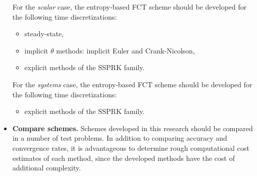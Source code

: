 \begin{itemize}
    For the \emph{scalar} case, the entropy-based FCT scheme should be
    developed for the following time discretizations:
    \begin{itemize}
      \item steady-state,
      \item implicit $\theta$ methods: implicit Euler and Crank-Nicolson,
      \item explicit methods of the SSPRK family.
    \end{itemize}
    For the \emph{systems} case, the entropy-based FCT scheme should be
    developed for the following time discretizations:
    \begin{itemize}
      \item explicit methods of the SSPRK family.
    \end{itemize}
  \item \textbf{Compare schemes.}
    Schemes developed in this research should be compared in a number of
    test problems. In addition to comparing accuracy and convergence rates,
    it is advantageous to determine rough computational cost estimates
    of each method, since the developed methods have the cost of additional
    complexity.
\end{itemize}

